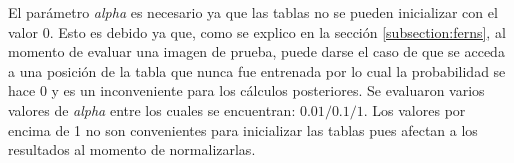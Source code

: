 	El parámetro \textit{alpha} es necesario ya que las tablas no se pueden inicializar con el valor $0$. Esto es debido ya que, como se explico en la sección \ref{subsection:ferns}, al momento de evaluar una imagen de prueba, puede darse el caso de que se acceda a una posición de la tabla que nunca fue entrenada por lo cual la probabilidad se hace 0 y es un inconveniente para los cálculos posteriores. Se evaluaron varios valores de \textit{alpha} entre los cuales se encuentran: $0.01/0.1/1$. Los valores por encima de 1 no son convenientes para inicializar las tablas pues afectan a los resultados al momento de normalizarlas.
	
	
	